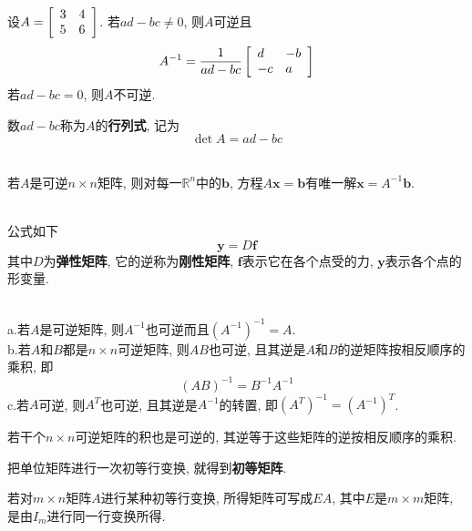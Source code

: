 \begin{theorem}
设$A=\left[\begin{array}{r r}3 & 4\\5 & 6\end{array}\right]$. 若$ad-bc\neq 0$, 则$A$可逆且
\[A^{-1}=\frac{1}{ad-bc}\left[\begin{array}{l l}d & -b\\-c & a\end{array}\right]\]
若$ad-bc=0$, 则$A$不可逆.
\end{theorem}\vspace{4ex}

数$ad-bc$称为$A$的\textbf{行列式}, 记为
\[\det A=ad-bc\]\\

\begin{theorem}
若$A$是可逆$n\times n$矩阵, 则对每一$\mathbb{R}^n$中的$\bm{b}$, 方程$A\bm{x}=\bm{b}$有唯一解$\bm{x}=A^{-1}\bm{b}$.
\end{theorem}\vspace{4ex}

\begin{law}[胡克定律]\ \\
公式如下
\[\bm{y}=D\bm{f}\]
其中$D$为\textbf{弹性矩阵}, 它的逆称为\textbf{刚性矩阵}, $\bm{f}$表示它在各个点受的力, $\bm{y}$表示各个点的形变量.
\end{law}\vspace{4ex}

\begin{theorem}\ \\
a.若$A$是可逆矩阵, 则$A^{-1}$也可逆而且$(A^{-1})^{-1}=A$.\\
b.若$A$和$B$都是$n\times n$可逆矩阵, 则$AB$也可逆, 且其逆是$A$和$B$的逆矩阵按相反顺序的乘积, 即
\[(AB)^{-1}=B^{-1}A^{-1}\]
c.若$A$可逆, 则$A^T$也可逆, 且其逆是$A^{-1}$的转置, 即$(A^T)^{-1}=(A^{-1})^T$.
\end{theorem}\vspace{4ex}

\begin{law}
若干个$n\times n$可逆矩阵的积也是可逆的, 其逆等于这些矩阵的逆按相反顺序的乘积.
\end{law}\vspace{4ex}

把单位矩阵进行一次初等行变换, 就得到\textbf{初等矩阵}.\\[2ex]

\begin{law}
若对$m\times n$矩阵$A$进行某种初等行变换, 所得矩阵可写成$EA$, 其中$E$是$m\times m$矩阵, 是由$I_m$进行同一行变换所得.
\end{law}\vspace{4ex}

